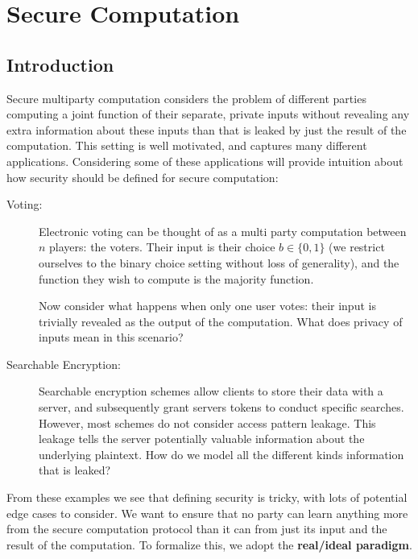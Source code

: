 \algrenewcommand{}

\renewcommand{\O}{\ensuremath{\mathcal{O}}}

\renewcommand{\P}{\cclass{P}}

\renewcommand{\Enc}{\mathsf{Enc}}
\renewcommand{\Dec}{\mathsf{Dec}}
\renewcommand{\sk}{\mathsf{sk}}

\chapter{Secure Computation}

\section{Introduction}
Secure multiparty computation considers the problem of different parties
computing a joint function of their separate, private inputs without revealing
any extra information about these inputs than that is leaked by just the result
of the computation. This setting is well motivated, and captures many different
applications. Considering some of these applications will provide intuition
about how security should be defined for secure computation:
\begin{description}
  \item[Voting:] Electronic voting can be thought of as a multi party computation
	  between $n$ players: the voters. Their input is their choice $b \in \{0,1\}$
    (we restrict ourselves to the binary choice setting without loss of generality), and the function
    they wish to compute is the majority function.

    Now consider what happens when only one user votes: their input is trivially
    revealed as the output of the computation. What does privacy of inputs mean
    in this scenario?

  \item[Searchable Encryption:] Searchable encryption schemes allow clients
    to store their data with a server, and subsequently grant servers tokens
    to conduct specific searches. However, most schemes do not consider access
    pattern leakage. This leakage tells the server potentially valuable information
    about the underlying plaintext. How do we model all the different kinds
    information that is leaked?
\end{description}

From these examples we see that defining security is tricky, with lots of
potential edge cases to consider. We want to ensure that no party can learn
anything more from the secure computation protocol than it can from just its
input and the result of the computation. To formalize this, we adopt the
\textbf{real/ideal paradigm}.



